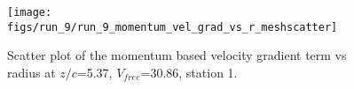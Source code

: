 \begin{figure}[H]
\centering
\texttt{[image: figs/run\_9/run\_9\_momentum\_vel\_grad\_vs\_r\_meshscatter]}
\caption{Scatter plot of the momentum based velocity gradient term vs radius at $z/c$=5.37, $V_{free}$=30.86, station 1.}
\label{fig:run_9_momentum_vel_grad_vs_r_meshscatter}
\end{figure}


